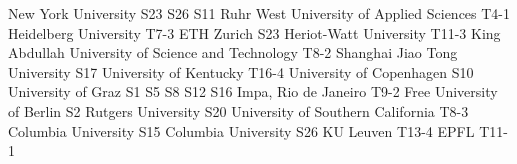 \begin{multicols}{2}
{New York University}
{S23}
{S26}
{S11}
{}
{}
{}
{}
{Ruhr West University of Applied Sciences}
{T4-1}
{}
{}
{}
{}
{}
{}
{Heidelberg University}
{T7-3}
{}
{}
{}
{}
{}
{}
{ETH Zurich}
{S23}
{}
{}
{}
{}
{}
{}
{Heriot-Watt University}
{T11-3}
{}
{}
{}
{}
{}
{}
{King Abdullah University of Science and Technology}
{T8-2}
{}
{}
{}
{}
{}
{}
{Shanghai Jiao Tong University}
{S17}
{}
{}
{}
{}
{}
{}
{University of Kentucky}
{T16-4}
{}
{}
{}
{}
{}
{}
{University of Copenhagen}
{S10}
{}
{}
{}
{}
{}
{}
{University of Graz}
{S1}
{S5}
{S8}
{S12}
{S16}
{}
{}
{Impa, Rio de Janeiro}
{T9-2}
{}
{}
{}
{}
{}
{}
{Free University of Berlin}
{S2}
{}
{}
{}
{}
{}
{}
{Rutgers University}
{S20}
{}
{}
{}
{}
{}
{}
{University of Southern California}
{T8-3}
{}
{}
{}
{}
{}
{}
{Columbia University}
{S15}
{}
{}
{}
{}
{}
{}
{Columbia University}
{S26}
{}
{}
{}
{}
{}
{}
{KU Leuven}
{T13-4}
{}
{}
{}
{}
{}
{}
{EPFL}
{T11-1}
{}
{}
{}
{}
{}
{}
\end{multicols}
